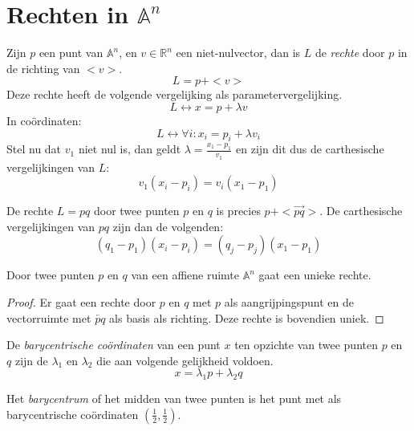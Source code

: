\documentclass[main.tex]{subfiles}
\begin{document}
\section{Rechten in $\mathbb{A}^{n}$}
\begin{de}
  \label{de:rechte}
  Zijn $p$ een punt van $\mathbb{A}^{n}$, en $v\in \mathbb{R}^{n}$ een niet-nulvector, dan is $L$ de \emph{rechte} door $p$ in de richting van $<v>$.
  \[
  L = p + <v>
  \]
  Deze rechte heeft de volgende vergelijking als parametervergelijking.
  \[
  L \leftrightarrow x = p + \lambda v
  \]
  In co\"ordinaten:
  \[
  L \leftrightarrow \forall i: x_{i} = p_{i} + \lambda v_{i}
  \]
  Stel nu dat $v_{1}$ niet nul is, dan geldt $\lambda = \frac{x_{1}-p_{1}}{v_{1}}$ en zijn dit dus de carthesische vergelijkingen van $L$:
  \[
  v_{1}(x_{i}-p_{i}) = v_{i}(x_{1}-p_{1})
  \]
\end{de}

\begin{st}
  De rechte $L=pq$ door twee punten $p$ en $q$ is precies $p + <\vec{pq}>$.
  De carthesische vergelijkingen van $pq$ zijn dan de volgenden:
  \[
  (q_{1}-p_{1})(x_{i}-p_{i}) = (q_{j}-p_{j})(x_{1}-p_{1})
  \]

\end{st}


\begin{st}
  \label{st:unieke-rechte-door-twee-punten}
  Door twee punten $p$ en $q$ van een affiene ruimte $\mathbb{A}^{n}$ gaat een unieke rechte.

  \begin{proof}
    Er gaat een rechte door $p$ en $q$ met $p$ als aangrijpingspunt en de vectorruimte met $\overleftarrow{pq}$ als basis als richting.
    Deze rechte is bovendien uniek.
  \end{proof}
\end{st}

\begin{de}
  De \emph{barycentrische co\"ordinaten} van een punt $x$ ten opzichte van twee punten $p$ en $q$ zijn de $\lambda_{1}$ en $\lambda_{2}$ die aan volgende gelijkheid voldoen.
  \[ x = \lambda_{1}p + \lambda_{2}q \]
\end{de}

\begin{de}
  Het \emph{barycentrum} of het midden van twee punten is het punt met als barycentrische co\"ordinaten $(\frac{1}{2},\frac{1}{2})$.
\end{de}
\end{document}
